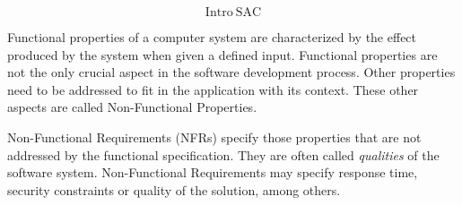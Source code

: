 {%
%










\[ \mathrm{Intro\ SAC} \]

Functional properties of a computer system are characterized by the effect produced by the system when given a defined input.
Functional properties are not the only crucial aspect in the software development process. 
Other properties need to be addressed to fit in the application with its context.
These other aspects are called Non-Functional Properties.

Non-Functional Requirements (NFRs) specify those properties that are not addressed by the functional  specification.
They are often called \textit{qualities} of the software system.
Non-Functional Requirements may specify response time, security constraints or quality of the solution, among others.




}
